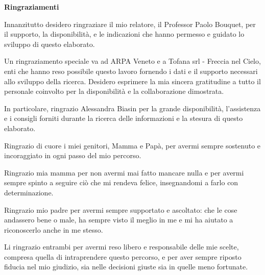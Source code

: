 \cleardoublepage
\thispagestyle{empty}

\vspace*{1cm}

\begin{center}
{\Huge \textbf{Ringraziamenti}}
\end{center}

\vspace{1cm}

\begin{flushleft}

Innanzitutto desidero ringraziare il mio relatore, il Professor Paolo Bouquet, per il supporto, la disponibilità, e le indicazioni che hanno permesso e guidato lo sviluppo di questo elaborato.
\par\vspace{2em}

Un ringraziamento speciale va ad ARPA Veneto e a Tofana srl - Freccia nel Cielo, enti che hanno reso possibile questo lavoro fornendo i dati e il supporto necessari allo sviluppo della ricerca. Desidero esprimere la mia sincera gratitudine a tutto il personale coinvolto per la disponibilità e la collaborazione dimostrata.
\par\vspace{2em}

In particolare, ringrazio Alessandra Biasin per la grande disponibilità,  l’assistenza e i consigli forniti durante la ricerca delle informazioni e la stesura di questo elaborato.
\par\vspace{2em}

Ringrazio di cuore i miei genitori, Mamma e Papà, per avermi sempre sostenuto e incoraggiato in ogni passo del mio percorso.

Ringrazio mia mamma per non avermi mai fatto mancare nulla e per avermi sempre spinto a seguire ciò che mi rendeva felice, insegnandomi a farlo con determinazione.

Ringrazio mio padre per avermi sempre supportato e ascoltato: che le cose andassero bene o male, ha sempre visto il meglio in me e mi ha aiutato a riconoscerlo anche in me stesso.

Li ringrazio entrambi per avermi reso libero e responsabile delle mie scelte, compresa quella di intraprendere questo percorso, e per aver sempre riposto fiducia nel mio giudizio, sia nelle decisioni giuste sia in quelle meno fortunate.

\par\vspace{2em}



\end{flushleft}
